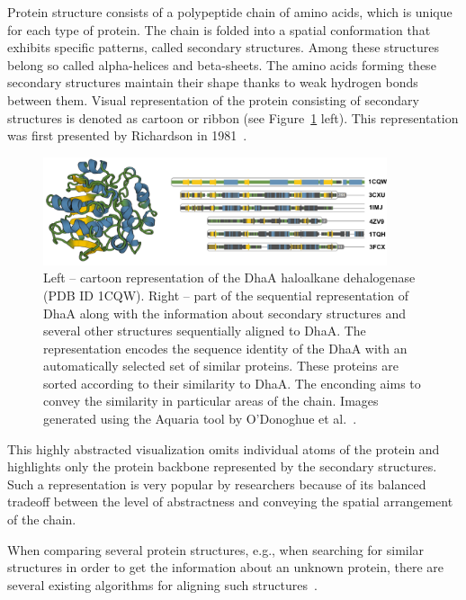 \documentclass[twocolumn]{bmcart}%
\begin{document}
Protein structure consists of a polypeptide chain of amino acids, which is unique for each type of protein. 
The chain is folded into a spatial conformation that exhibits specific patterns, called secondary structures.
Among these structures belong so called alpha-helices and beta-sheets. 
The amino acids forming these secondary structures maintain their shape thanks to weak hydrogen bonds between them.
Visual representation of the protein consisting of secondary structures is denoted as cartoon or ribbon (see Figure~\ref{fig:aquaria} left).
This representation was first presented by Richardson in 1981~\cite{Richardson1981}.


\begin{figure}[th]
  \centering
  \includegraphics[width=0.9\textwidth]{pics/aquaria2.png}
  \caption{Left -- cartoon representation of the DhaA haloalkane dehalogenase (PDB ID 1CQW). Right -- part of the sequential representation of DhaA along with the information about secondary structures and several other structures sequentially aligned to DhaA. The representation encodes the sequence identity of the DhaA with an automatically selected set of similar proteins. These proteins are sorted according to their similarity to DhaA. The enconding aims to convey the similarity in particular areas of the chain. Images generated using the Aquaria tool by O'Donoghue et al.~\cite{odonoghue2015}.}
  \label{fig:aquaria}
\end{figure}

This highly abstracted visualization omits individual atoms of the protein and highlights only the protein backbone represented by the secondary structures.
Such a representation is very popular by researchers because of its balanced tradeoff between the level of abstractness and conveying the spatial arrangement of the chain.

When comparing several protein structures, e.g., when searching for similar structures in order to get the information about an unknown protein, there are several existing algorithms for aligning such structures~\cite{dali,Shindyalov1998,ssap,tmalign,promals3d}.
\end{document}
